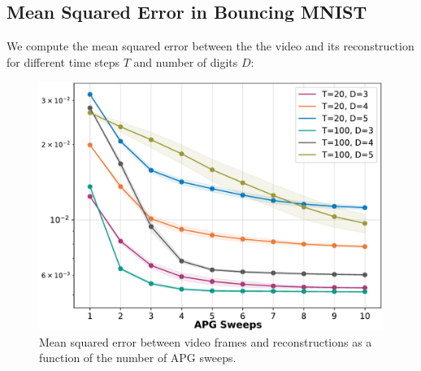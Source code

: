 \documentclass[anonymous=false, %
               format=acmsmall, %
               review=true, %
               screen=true, %
               nonacm=true]{acmart}
\theoremstyle{definition}
\begin{document}
\subsection{Mean Squared Error in Bouncing MNIST}
\label{appendix:bmnist-mse}
We compute the mean squared error between the the video and its reconstruction for different time steps $T$ and number of digits $D$:
\begin{figure}[!h]
    \centering
    \includegraphics[width=0.5\columnwidth]{figures/bmnist-mse.pdf}
    \caption{Mean squared error between video frames and reconstructions as a function of the number of APG sweeps. }
    \label{plot-mse-bmnist}
\end{figure}

\newpage
\end{document}
